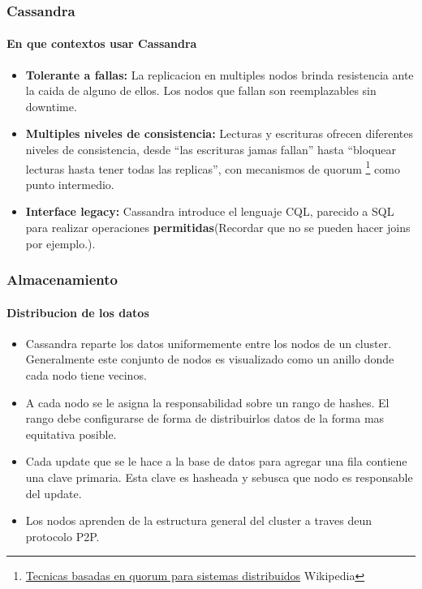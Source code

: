 \documentclass{beamer}
\begin{document}
\begin{frame}
  \frametitle{Cassandra}
  \framesubtitle{En que contextos usar Cassandra}
  \begin{itemize}
    \setlength{\itemsep}{3pt}
    \item \textbf{Tolerante a fallas: } La replicacion en multiples nodos brinda resistencia ante la caida de alguno de ellos. Los nodos que fallan son reemplazables sin downtime.
    \pause
    \item \textbf{Multiples niveles de consistencia: } Lecturas y escrituras ofrecen diferentes niveles de consistencia, desde ``las escrituras jamas fallan'' hasta ``bloquear lecturas hasta tener todas las replicas'', con mecanismos de quorum \footnote{ \href{https://en.wikipedia.org/wiki/Quorum_(distributed_computing)}{Tecnicas basadas en quorum para sistemas distribuidos} Wikipedia} como punto intermedio.
    \pause
    \item \textbf{Interface legacy: } Cassandra introduce el lenguaje CQL, parecido a SQL para realizar operaciones \textbf{permitidas}(Recordar que no se pueden hacer joins por ejemplo.).
  \end{itemize}
\end{frame}




\begin{frame}
  \frametitle{Almacenamiento}
  \framesubtitle{Distribucion de los datos}
   
  \begin{itemize}
    \setlength{\itemsep}{2pt}
    \item Cassandra reparte los datos uniformemente entre los nodos de un cluster. Generalmente este conjunto de nodos es visualizado como un anillo donde cada nodo tiene vecinos.
    \pause
    \item A cada nodo se le asigna la responsabilidad sobre un rango de hashes. El rango debe configurarse de forma de distribuirlos datos de la forma mas equitativa posible. 
    \pause
    \item Cada update que se le hace a la base de datos para agregar una fila contiene una clave primaria. Esta clave es hasheada y sebusca que nodo es responsable del update.
    \pause
    \item Los nodos aprenden de la estructura general del cluster a traves deun protocolo P2P.


    \end{itemize}
\end{frame}
\end{document}
